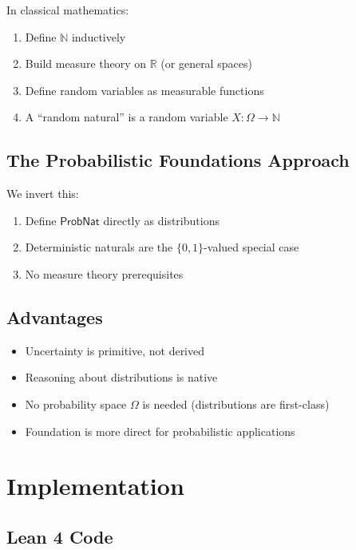 \documentclass[11pt,a4paper]{article}
\newcommand{\ProbNat}{\mathsf{ProbNat}}
\newcommand{\Nat}{\mathbb{N}}
\begin{document}
In classical mathematics:
\begin{enumerate}
    \item Define $\Nat$ inductively
    \item Build measure theory on $\mathbb{R}$ (or general spaces)
    \item Define random variables as measurable functions
    \item A ``random natural'' is a random variable $X : \Omega \to \Nat$
\end{enumerate}

\subsection{The Probabilistic Foundations Approach}

We invert this:
\begin{enumerate}
    \item Define $\ProbNat$ directly as distributions
    \item Deterministic naturals are the $\{0,1\}$-valued special case
    \item No measure theory prerequisites
\end{enumerate}

\subsection{Advantages}

\begin{itemize}
    \item Uncertainty is primitive, not derived
    \item Reasoning about distributions is native
    \item No probability space $\Omega$ is needed (distributions are first-class)
    \item Foundation is more direct for probabilistic applications
\end{itemize}

\section{Implementation}

\subsection{Lean 4 Code}
\end{document}
